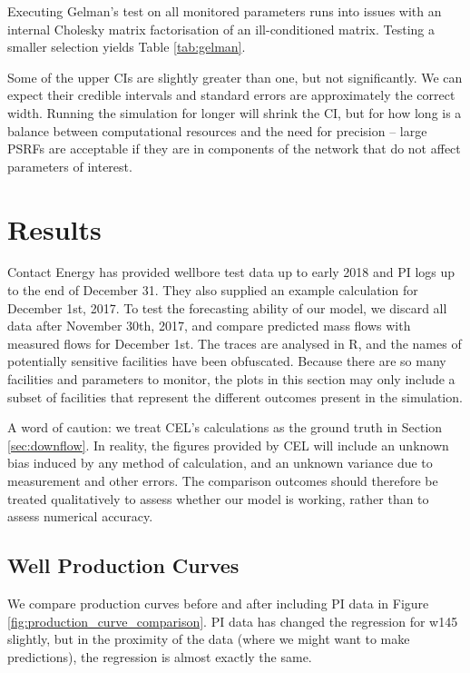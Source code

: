 \documentclass[a4paper, 12pt]{article}
\begin{document}
Executing Gelman's test on all monitored parameters runs into issues with an internal Cholesky matrix factorisation of an ill-conditioned matrix. Testing a smaller selection yields Table \ref{tab:gelman}.



Some of the upper CIs are slightly greater than one, but not significantly. We can expect their credible intervals and standard errors are approximately the correct width. Running the simulation for longer will shrink the CI, but for how long is a balance between computational resources and the need for precision -- large PSRFs are acceptable if they are in components of the network that do not affect parameters of interest.

\section{Results}
Contact Energy has provided wellbore test data up to early 2018 and PI logs up to the end of December 31. They also supplied an example calculation for December 1st, 2017. To test the forecasting ability of our model, we discard all data after November 30th, 2017, and compare predicted mass flows with measured flows for December 1st. The traces are analysed in R, and the names of potentially sensitive facilities have been obfuscated. Because there are so many facilities and parameters to monitor, the plots in this section may only include a subset of facilities that represent the different outcomes present in the simulation.

A word of caution: we treat CEL's calculations as the ground truth in Section \ref{sec:downflow}. In reality, the figures provided by CEL will include an unknown bias induced by any method of calculation, and an unknown variance due to measurement and other errors. The comparison outcomes should therefore be treated qualitatively to assess whether our model is working, rather than to assess numerical accuracy.

\subsection{Well Production Curves}

We compare production curves before and after including PI data in Figure \ref{fig:production_curve_comparison}. PI data has changed the regression for w145 slightly, but in the proximity of the data (where we might want to make predictions), the regression is almost exactly the same.
\end{document}

